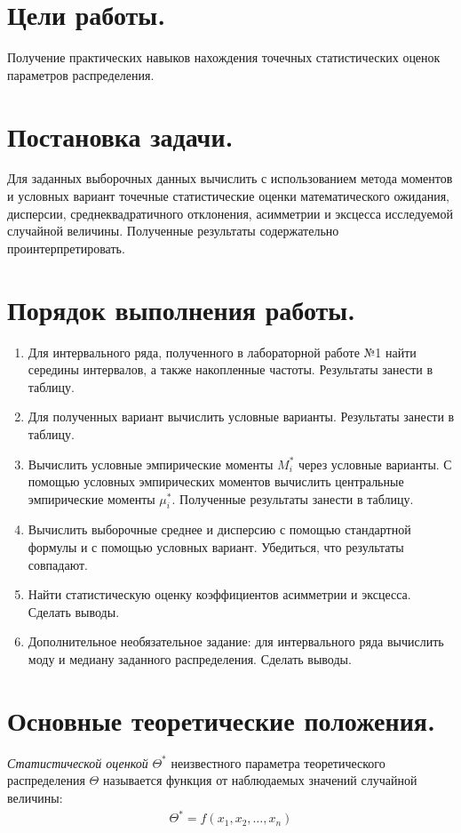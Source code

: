 \setcounter{page}{2}
\section*{Цели работы.}
Получение практических навыков нахождения точечных статистических оценок параметров распределения.

\section*{Постановка задачи.}
Для заданных выборочных данных вычислить с использованием метода моментов и условных вариант
точечные статистические оценки математического ожидания, дисперсии, среднеквадратичного
отклонения, асимметрии и эксцесса исследуемой случайной величины.
Полученные результаты содержательно проинтерпретировать.

\section*{Порядок выполнения работы.}
\begin{enumerate}
    \item Для интервального ряда, полученного в лабораторной работе №1 найти середины интервалов, а также накопленные частоты. Результаты занести в таблицу.
    \item Для полученных вариант вычислить условные варианты. Результаты занести в таблицу.
    \item Вычислить условные эмпирические моменты $M_i^*$ через условные варианты. С помощью условных эмпирических моментов вычислить центральные эмпирические моменты $\mu_i^*$. Полученные результаты занести в таблицу.
    \item Вычислить выборочные среднее и дисперсию с помощью стандартной формулы и с помощью условных вариант. Убедиться, что результаты совпадают.
    \item Найти статистическую оценку коэффициентов асимметрии и эксцесса. Сделать выводы.
    \item Дополнительное необязательное задание: для интервального ряда вычислить моду и медиану заданного распределения. Сделать выводы.
\end{enumerate}

\section*{Основные теоретические положения.}
\textit{Статистической оценкой} $\Theta^*$ неизвестного параметра теоретического
распределения $\Theta$ называется функция от наблюдаемых значений случайной величины:
\begin{gather*}
    \Theta^* = f(x_1, x_2, \dots, x_n)
\end{gather*}

